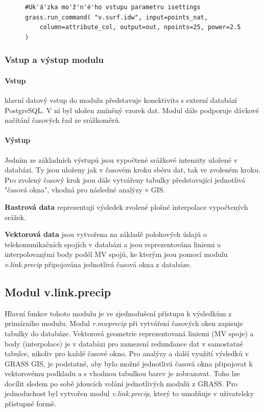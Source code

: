 \documentclass[a4paper,12pt,oneside]{report}
\begin{document}
\begin{figure}[h!]
\begin{footnotesize}
\lstset{extendedchars=false,
escapeinside=''}
\begin{lstlisting}[style=mybash]
#Uk'á'zka mo'ž'n'é'ho vstupu parametru isettings
grass.run_command( "v.surf.idw", input=points_nat,
	column=attribute_col, output=out, npoints=25, power=2.5 )                            
\end{lstlisting}
\end{footnotesize} 
\end{figure}


 
\subsubsection{Vstup a výstup modulu}
\paragraph*{Vstup} hlavní datový vstup do modulu představuje
konektivita s externí databází PostgreSQL. V ní byl uložen zmíněný
vzorek dat.  Modul dále podporuje dávkové načítání časových řad ze
srážkoměrů.

\paragraph*{Výstup}
Jedním ze základních výstupů jsou vypočtené srážkové intenzity uložené
v databázi. Ty jsou uloženy jak v časovém kroku sběru dat, tak ve
zvoleném kroku. Pro zvolený časový krok jsou dále vytvářeny tabulky
představující jednotlivá "časová okna", vhodná pro následné
analýzy v GIS.

\textbf{Rastrová data} reprezentují výsledek zvolené plošné
interpolace vypočtených srážek.

\textbf{Vektorová data} jsou vytvořena na základě polohových údajů o
telekomunikačních spojích v databázi a jsou reprezentována liniemi a
interpolovanými body podél MV spojů, ke kterým jsou pomocí modulu
\textit{v.link.precip} připojována jednotlivá časová okna z databáze.



\subsection{Modul v.link.precip}
Hlavní funkce  tohoto modulu je ve  zjednodušení přístupu k
výsledkům z primárního modulu. Modul \textit{r.mwprecip} při vytváření
časových oken zapisuje tabulky do databáze. Vektorová geometrie
reprezentovaná liniemi (MV spoje) a body (interpolace) je v databázi
pro zamezení redundance dat v samostatné tabulce, nikoliv pro každé
časové okno. Pro analýzy a další využití výsledků v GRASS GIS, je
podstatné, aby bylo možné jednotlivá časová okna připojovat k
vektorovému podkladu a s vhodnou tabulkou barev je zobrazovat.  Toho
lze docílit sledem po sobě jdoucích volání jednotlivých modulů z
GRASS. Pro jednoduchost byl vytvořen modul \textit{v.link.precip},
který to umožňuje v uživatelsky přístupné formě.
\end{document}
